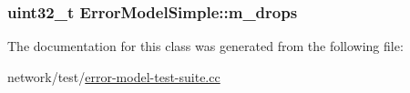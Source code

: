 \subsubsection[{\texorpdfstring{m\+\_\+drops}{m_drops}}]{\setlength{\rightskip}{0pt plus 5cm}uint32\+\_\+t Error\+Model\+Simple\+::m\+\_\+drops\hspace{0.3cm}{\ttfamily [private]}}\hypertarget{classErrorModelSimple_a07b0c427e3e0d593be018036a485bfa2}{}\label{classErrorModelSimple_a07b0c427e3e0d593be018036a485bfa2}


The documentation for this class was generated from the following file\+:\begin{DoxyCompactItemize}
\item 
network/test/\hyperlink{error-model-test-suite_8cc}{error-\/model-\/test-\/suite.\+cc}\end{DoxyCompactItemize}
